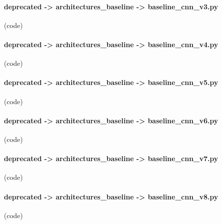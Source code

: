 \begin{myparindent}{0pt}

\noindent\paragraph[baseline\_cnn\_v3.py]{deprecated -> architectures\_baseline -> baseline\_cnn\_v3.py} (code)

\noindent\paragraph[baseline\_cnn\_v4.py]{deprecated -> architectures\_baseline -> baseline\_cnn\_v4.py} (code)

\noindent\paragraph[baseline\_cnn\_v5.py]{deprecated -> architectures\_baseline -> baseline\_cnn\_v5.py} (code)

\noindent\paragraph[baseline\_cnn\_v6.py]{deprecated -> architectures\_baseline -> baseline\_cnn\_v6.py} (code)

\noindent\paragraph[baseline\_cnn\_v7.py]{deprecated -> architectures\_baseline -> baseline\_cnn\_v7.py} (code)

\noindent\paragraph[baseline\_cnn\_v8.py]{deprecated -> architectures\_baseline -> baseline\_cnn\_v8.py} (code)


\end{myparindent}
